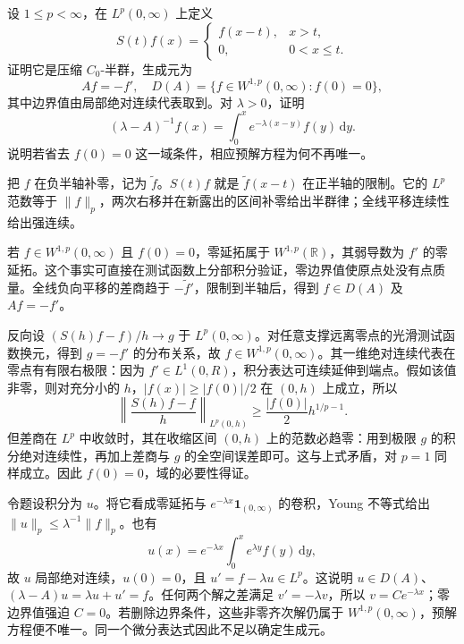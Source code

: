 \begin{exercise}\label{b2:ex:app-D-4}
设 \(1\leq p<\infty\)，在 \(L^p(0,\infty)\) 上定义
\[
 S(t)f(x)=
 \begin{cases}f(x-t),&x>t,\\0,&0<x\leq t.\end{cases}
\]
证明它是压缩 \(C_0\)-半群，生成元为
\[
 Af=-f',\quad D(A)=\{f\in W^{1,p}(0,\infty):f(0)=0\},
\]
其中边界值由局部绝对连续代表取到。对 \(\lambda>0\)，证明
\[
 (\lambda-A)^{-1}f(x)=\int_0^x e^{-\lambda(x-y)}f(y)\,\mathrm dy.
\]
说明若省去 \(f(0)=0\) 这一域条件，相应预解方程为何不再唯一。
\end{exercise}
\begin{solution}
把 \(f\) 在负半轴补零，记为 \(\widetilde f\)。\(S(t)f\) 就是 \(\widetilde f(x-t)\) 在正半轴的限制。它的 \(L^p\) 范数等于 \(\|f\|_p\)，两次右移并在新露出的区间补零给出半群律；全线平移连续性给出强连续。

若 \(f\in W^{1,p}(0,\infty)\) 且 \(f(0)=0\)，零延拓属于 \(W^{1,p}(\mathbb R)\)，其弱导数为 \(f'\) 的零延拓。这个事实可直接在测试函数上分部积分验证，零边界值使原点处没有点质量。全线负向平移的差商趋于 \(-\widetilde f'\)，限制到半轴后，得到 \(f\in D(A)\) 及 \(Af=-f'\)。

反向设 \((S(h)f-f)/h\to g\) 于 \(L^p(0,\infty)\)。对任意支撑远离零点的光滑测试函数换元，得到 \(g=-f'\) 的分布关系，故 \(f\in W^{1,p}(0,\infty)\)。其一维绝对连续代表在零点有有限右极限：因为 \(f'\in L^1(0,R)\)，积分表达可连续延伸到端点。假如该值非零，则对充分小的 \(h\)，\(|f(x)|\geq|f(0)|/2\) 在 \((0,h)\) 上成立，所以
\[
 \left\|\frac{S(h)f-f}{h}\right\|_{L^p(0,h)}
 \geq\frac{|f(0)|}{2}h^{1/p-1}.
\]
但差商在 \(L^p\) 中收敛时，其在收缩区间 \((0,h)\) 上的范数必趋零：用到极限 \(g\) 的积分绝对连续性，再加上差商与 \(g\) 的全空间误差即可。这与上式矛盾，对 \(p=1\) 同样成立。因此 \(f(0)=0\)，域的必要性得证。

令题设积分为 \(u\)。将它看成零延拓与 \(e^{-\lambda x}\mathbf1_{(0,\infty)}\) 的卷积，Young 不等式给出 \(\|u\|_p\leq\lambda^{-1}\|f\|_p\)。也有
\[
 u(x)=e^{-\lambda x}\int_0^xe^{\lambda y}f(y)\,\mathrm dy,
\]
故 \(u\) 局部绝对连续，\(u(0)=0\)，且 \(u'=f-\lambda u\in L^p\)。这说明 \(u\in D(A)\)、\((\lambda-A)u=\lambda u+u'=f\)。任何两个解之差满足 \(v'=-\lambda v\)，所以 \(v=Ce^{-\lambda x}\)；零边界值强迫 \(C=0\)。若删除边界条件，这些非零齐次解仍属于 \(W^{1,p}(0,\infty)\)，预解方程便不唯一。同一个微分表达式因此不足以确定生成元。
\end{solution}

